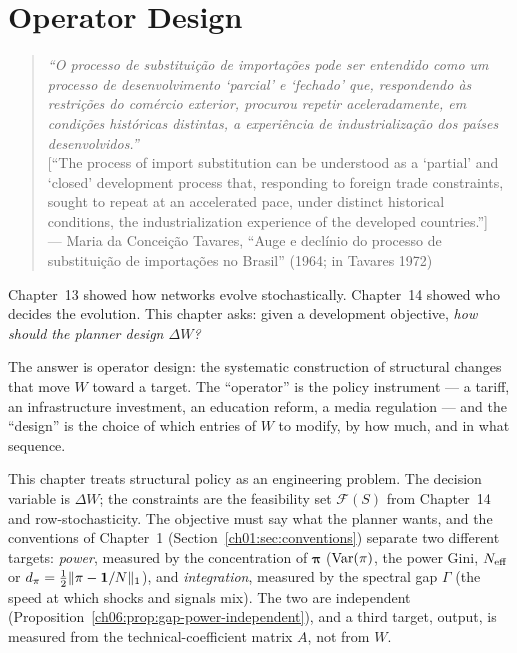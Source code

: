 \documentclass[../structural_economics_book.tex]{subfiles}
\begin{document}
\ifSubfilesClassLoaded{\setcounter{chapter}{14}}{}
\chapter{Operator Design}\label{ch:15}
\begin{quote}
\textit{``O processo de substitui\c{c}\~{a}o de importa\c{c}\~{o}es pode ser entendido como um processo de desenvolvimento `parcial' e `fechado' que, respondendo \`{a}s restri\c{c}\~{o}es do com\'{e}rcio exterior, procurou repetir aceleradamente, em condi\c{c}\~{o}es hist\'{o}ricas distintas, a experi\^{e}ncia de industrializa\c{c}\~{a}o dos pa\'{i}ses desenvolvidos.''}\\[0.3em]
\textnormal{[``The process of import substitution can be understood as a `partial' and `closed' development process that, responding to foreign trade constraints, sought to repeat at an accelerated pace, under distinct historical conditions, the industrialization experience of the developed countries.'']}\\
\hfill --- Maria da Concei\c{c}\~{a}o Tavares, ``Auge e decl\'{i}nio do processo de substitui\c{c}\~{a}o de importa\c{c}\~{o}es no Brasil'' (1964; in Tavares 1972)
\end{quote}
\nocite{tavares1964auge,tavares1972substituicao}

\vspace{1em}

Chapter~13 showed how networks evolve stochastically. Chapter~14 showed who decides the evolution. This chapter asks: given a development objective, \textit{how should the planner design $\Delta W$?}

The answer is operator design: the systematic construction of structural changes that move $W$ toward a target. The ``operator'' is the policy instrument --- a tariff, an infrastructure investment, an education reform, a media regulation --- and the ``design'' is the choice of which entries of $W$ to modify, by how much, and in what sequence.

This chapter treats structural policy as an engineering problem. The decision variable is $\Delta W$; the constraints are the feasibility set $\mathcal{F}(S)$ from Chapter~14 and row-stochasticity. The objective must say what the planner wants, and the conventions of Chapter~1 (Section~\ref{ch01:sec:conventions}) separate two different targets: \emph{power}, measured by the concentration of $\boldsymbol{\pi}$ ($\operatorname{Var}(\pi)$, the power Gini, $N_{\text{eff}}$ or $d_\pi = \frac12\|\pi - \mathbf{1}/N\|_1$), and \emph{integration}, measured by the spectral gap $\Gamma$ (the speed at which shocks and signals mix). The two are independent (Proposition~\ref{ch06:prop:gap-power-independent}), and a third target, output, is measured from the technical-coefficient matrix $A$, not from $W$.
\end{document}
